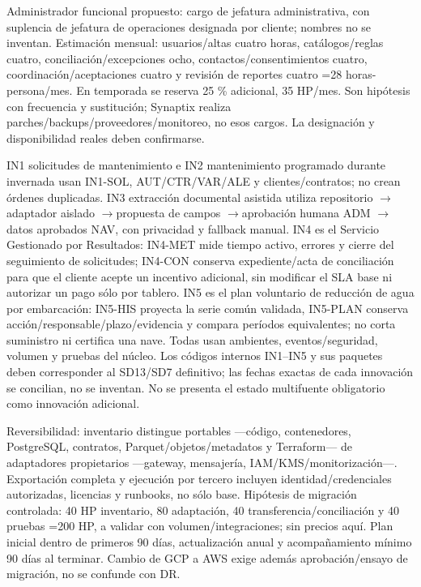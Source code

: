 \documentclass[11pt,letterpaper]{report}
\begin{document}
Administrador funcional propuesto: cargo de jefatura administrativa, con suplencia de jefatura de operaciones designada por cliente; nombres no se inventan. Estimación mensual: usuarios/altas cuatro horas, catálogos/reglas cuatro, conciliación/excepciones ocho, contactos/consentimientos cuatro, coordinación/aceptaciones cuatro y revisión de reportes cuatro =28 horas-persona/mes. En temporada se reserva 25 \% adicional, 35 HP/mes. Son hipótesis con frecuencia y sustitución; Synaptix realiza parches/backups/proveedores/monitoreo, no esos cargos. La designación y disponibilidad reales deben confirmarse.

IN1 solicitudes de mantenimiento e IN2 mantenimiento programado durante invernada usan IN1-SOL, AUT/CTR/VAR/ALE y clientes/contratos; no crean órdenes duplicadas. IN3 extracción documental asistida utiliza repositorio $\rightarrow$adaptador aislado $\rightarrow$propuesta de campos $\rightarrow$aprobación humana ADM $\rightarrow$datos aprobados NAV, con privacidad y fallback manual. IN4 es el Servicio Gestionado por Resultados: IN4-MET mide tiempo activo, errores y cierre del seguimiento de solicitudes; IN4-CON conserva expediente/acta de conciliación para que el cliente acepte un incentivo adicional, sin modificar el SLA base ni autorizar un pago sólo por tablero. IN5 es el plan voluntario de reducción de agua por embarcación: IN5-HIS proyecta la serie común validada, IN5-PLAN conserva acción/responsable/plazo/evidencia y compara períodos equivalentes; no corta suministro ni certifica una nave. Todas usan ambientes, eventos/seguridad, volumen y pruebas del núcleo. Los códigos internos IN1--IN5 y sus paquetes deben corresponder al SD13/SD7 definitivo; las fechas exactas de cada innovación se concilian, no se inventan. No se presenta el estado multifuente obligatorio como innovación adicional.

Reversibilidad: inventario distingue portables ---código, contenedores, PostgreSQL, contratos, Parquet/objetos/metadatos y Terraform--- de adaptadores propietarios ---gateway, mensajería, IAM/KMS/monitorización---. Exportación completa y ejecución por tercero incluyen identidad/credenciales autorizadas, licencias y runbooks, no sólo base. Hipótesis de migración controlada: 40 HP inventario, 80 adaptación, 40 transferencia/conciliación y 40 pruebas =200 HP, a validar con volumen/integraciones; sin precios aquí. Plan inicial dentro de primeros 90 días, actualización anual y acompañamiento mínimo 90 días al terminar. Cambio de GCP a AWS exige además aprobación/ensayo de migración, no se confunde con DR.
\end{document}
